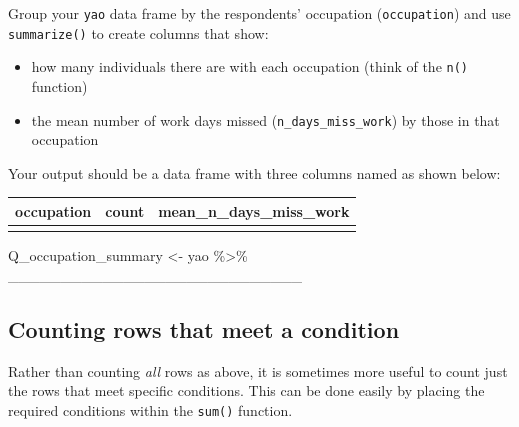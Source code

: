 \documentclass[
  letterpaper,
  DIV=11,
  numbers=noendperiod]{scrreprt}
\newenvironment{Shaded}{\begin{snugshade}}{\end{snugshade}}
\newcommand{\NormalTok}[1]{\textcolor[rgb]{0.00,0.23,0.31}{#1}}
\newcommand{\OtherTok}[1]{\textcolor[rgb]{0.00,0.23,0.31}{#1}}
\newcommand{\SpecialCharTok}[1]{\textcolor[rgb]{0.37,0.37,0.37}{#1}}
\providecommand{\tightlist}{%
  \setlength{\itemsep}{0pt}\setlength{\parskip}{0pt}}\usepackage{longtable,booktabs,array}
\begin{document}
\begin{tcolorbox}[enhanced jigsaw, colframe=quarto-callout-tip-color-frame, rightrule=.15mm, opacityback=0, breakable, coltitle=black, colbacktitle=quarto-callout-tip-color!10!white, bottomrule=.15mm, leftrule=.75mm, toprule=.15mm, arc=.35mm, bottomtitle=1mm, colback=white, left=2mm, opacitybacktitle=0.6, titlerule=0mm, title=\textcolor{quarto-callout-tip-color}{\faLightbulb}\hspace{0.5em}{Practice}, toptitle=1mm]

Group your \texttt{yao} data frame by the respondents' occupation
(\texttt{occupation}) and use \texttt{summarize()} to create columns
that show:

\begin{itemize}
\tightlist
\item
  how many individuals there are with each occupation (think of the
  \texttt{n()} function)
\item
  the mean number of work days missed (\texttt{n\_days\_miss\_work}) by
  those in that occupation
\end{itemize}

Your output should be a data frame with three columns named as shown
below:

\begin{longtable}[]{@{}lll@{}}
\toprule\noalign{}
occupation & count & mean\_n\_days\_miss\_work \\
\midrule\noalign{}
\endhead
\bottomrule\noalign{}
\endlastfoot
& & \\
\end{longtable}

\begin{Shaded}
\begin{Highlighting}[]
\NormalTok{Q\_occupation\_summary }\OtherTok{\textless{}{-}} 
\NormalTok{  yao }\SpecialCharTok{\%\textgreater{}\%}
\NormalTok{  \_\_\_\_\_\_\_\_\_\_\_\_\_\_\_\_\_\_\_\_\_\_\_\_\_\_\_\_}
\end{Highlighting}
\end{Shaded}

\end{tcolorbox}

\hypertarget{counting-rows-that-meet-a-condition}{%
\subsection{Counting rows that meet a
condition}\label{counting-rows-that-meet-a-condition}}

Rather than counting \emph{all} rows as above, it is sometimes more
useful to count just the rows that meet specific conditions. This can be
done easily by placing the required conditions within the \texttt{sum()}
function.
\end{document}
